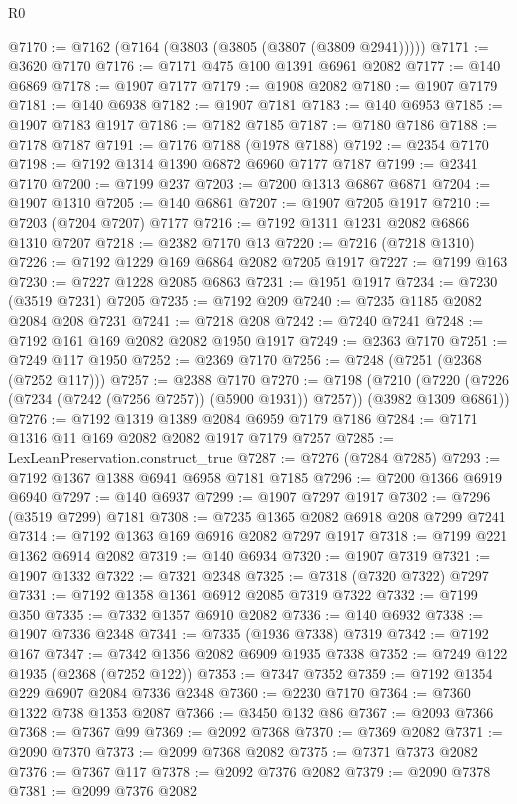 \begin{lexlean}{R0}
\begin{coremodule}
@7170 := @7162 (@7164 (@3803 (@3805 (@3807 (@3809 @2941)))))
@7171 := @3620 @7170
@7176 := @7171 @475 @100 @1391 @6961 @2082
@7177 := @140 @6869
@7178 := @1907 @7177
@7179 := @1908 @2082
@7180 := @1907 @7179
@7181 := @140 @6938
@7182 := @1907 @7181
@7183 := @140 @6953
@7185 := @1907 @7183 @1917
@7186 := @7182 @7185
@7187 := @7180 @7186
@7188 := @7178 @7187
@7191 := @7176 @7188 (@1978 @7188)
@7192 := @2354 @7170
@7198 := @7192 @1314 @1390 @6872 @6960 @7177 @7187
@7199 := @2341 @7170
@7200 := @7199 @237
@7203 := @7200 @1313 @6867 @6871
@7204 := @1907 @1310
@7205 := @140 @6861
@7207 := @1907 @7205 @1917
@7210 := @7203 (@7204 @7207) @7177
@7216 := @7192 @1311 @1231 @2082 @6866 @1310 @7207
@7218 := @2382 @7170 @13
@7220 := @7216 (@7218 @1310)
@7226 := @7192 @1229 @169 @6864 @2082 @7205 @1917
@7227 := @7199 @163
@7230 := @7227 @1228 @2085 @6863
@7231 := @1951 @1917
@7234 := @7230 (@3519 @7231) @7205
@7235 := @7192 @209
@7240 := @7235 @1185 @2082 @2084 @208 @7231
@7241 := @7218 @208
@7242 := @7240 @7241
@7248 := @7192 @161 @169 @2082 @2082 @1950 @1917
@7249 := @2363 @7170
@7251 := @7249 @117 @1950
@7252 := @2369 @7170
@7256 := @7248 (@7251 (@2368 (@7252 @117)))
@7257 := @2388 @7170
@7270 := @7198
    (@7210 (@7220 (@7226 (@7234 (@7242 (@7256 @7257)) (@5900 @1931)) @7257)) (@3982 @1309 @6861))
@7276 := @7192 @1319 @1389 @2084 @6959 @7179 @7186
@7284 := @7171 @1316 @11 @169 @2082 @2082 @1917 @7179 @7257
@7285 := LexLeanPreservation.construct_true
@7287 := @7276 (@7284 @7285)
@7293 := @7192 @1367 @1388 @6941 @6958 @7181 @7185
@7296 := @7200 @1366 @6919 @6940
@7297 := @140 @6937
@7299 := @1907 @7297 @1917
@7302 := @7296 (@3519 @7299) @7181
@7308 := @7235 @1365 @2082 @6918 @208 @7299 @7241
@7314 := @7192 @1363 @169 @6916 @2082 @7297 @1917
@7318 := @7199 @221 @1362 @6914 @2082
@7319 := @140 @6934
@7320 := @1907 @7319
@7321 := @1907 @1332
@7322 := @7321 @2348
@7325 := @7318 (@7320 @7322) @7297
@7331 := @7192 @1358 @1361 @6912 @2085 @7319 @7322
@7332 := @7199 @350
@7335 := @7332 @1357 @6910 @2082
@7336 := @140 @6932
@7338 := @1907 @7336 @2348
@7341 := @7335 (@1936 @7338) @7319
@7342 := @7192 @167
@7347 := @7342 @1356 @2082 @6909 @1935 @7338
@7352 := @7249 @122 @1935 (@2368 (@7252 @122))
@7353 := @7347 @7352
@7359 := @7192 @1354 @229 @6907 @2084 @7336 @2348
@7360 := @2230 @7170
@7364 := @7360 @1322 @738 @1353 @2087
@7366 := @3450 @132 @86
@7367 := @2093 @7366
@7368 := @7367 @99
@7369 := @2092 @7368
@7370 := @7369 @2082
@7371 := @2090 @7370
@7373 := @2099 @7368 @2082
@7375 := @7371 @7373 @2082
@7376 := @7367 @117
@7378 := @2092 @7376 @2082
@7379 := @2090 @7378
@7381 := @2099 @7376 @2082

\end{coremodule}
\end{lexlean}
